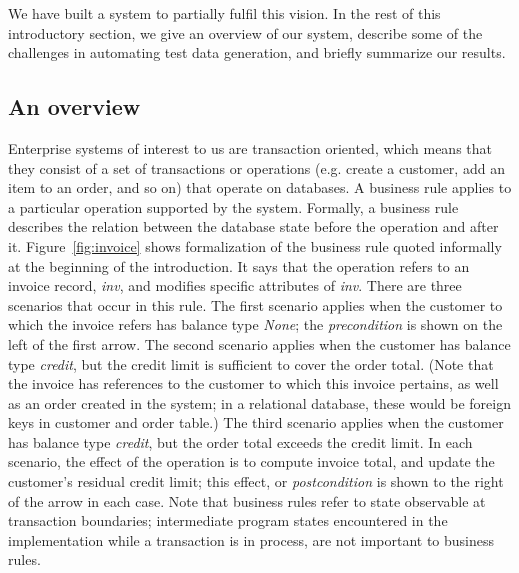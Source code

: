 We have built a system to partially fulfil this vision.  In the rest of this introductory section, we
give an overview of our system, describe some of the challenges in automating test data generation, and 
briefly summarize our results.


\subsection{An overview}

Enterprise systems of interest to us are transaction oriented, which means that they consist of a set of
transactions or operations (e.g. create a customer, add an item to an order, and so on) that operate on databases.  
A business rule applies to a particular operation supported by the system.  Formally, a business rule
describes the relation between the database state before the operation and after it.  Figure~\ref{fig:invoice} shows
formalization of the business rule quoted informally at the beginning of the introduction.  It says that
the operation refers to an invoice record, \textit{inv}, and modifies specific attributes of \textit{inv}.
There are three scenarios that occur in this rule.  The first scenario applies when the customer to which the
invoice refers has balance type \textit{None}; the \textit{precondition} is shown on the left of the first arrow.  
The second scenario applies when the customer has balance type \textit{credit}, but the credit limit is sufficient 
to cover the order total.  (Note that the invoice has references to the customer to which this invoice pertains, 
as well as an order created in the system; in a relational database, these would be foreign keys in customer and 
order table.)  The third scenario applies when the customer has balance type \textit{credit}, but the order total 
exceeds the credit limit.  In each scenario, the effect of the operation is to compute invoice total, and update 
the customer's residual credit limit; this effect, or \textit{postcondition} is shown to the right of the arrow 
in each case.  Note that business rules refer to state observable at transaction boundaries; intermediate program 
states encountered in the implementation while a transaction is in process, are not important to business rules.

